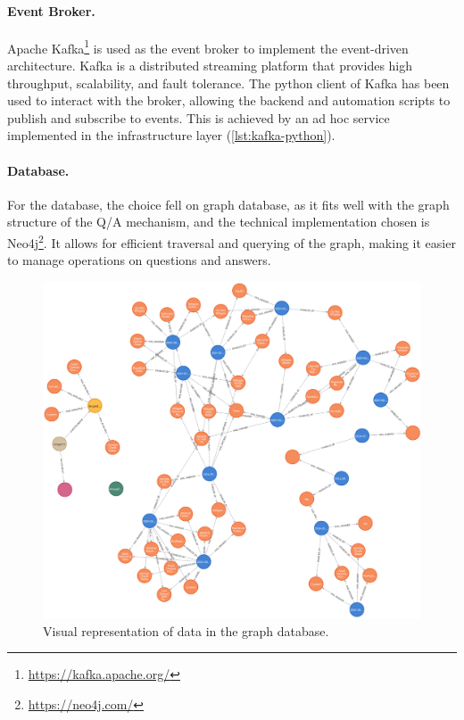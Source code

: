 \documentclass[12pt,a4paper,openright,twoside]{book}
\begin{document}
\paragraph{Event Broker.}

Apache Kafka\footnote{\href{https://kafka.apache.org/}{https://kafka.apache.org/}} is used as the event broker to implement the event-driven architecture.
%
Kafka is a distributed streaming platform that provides high throughput, scalability, and fault tolerance.
%
The python client of Kafka has been used to interact with the broker, allowing the backend and automation scripts to publish and subscribe to events.
%
This is achieved by an ad hoc service implemented in the infrastructure layer (\cref{lst:kafka-python}).





\paragraph{Database.}

For the database, the choice fell on graph database, as it fits well with the graph structure of the \ac{Q/A} mechanism, and the technical implementation chosen is Neo4j\footnote{\href{https://neo4j.com/}{https://neo4j.com/}}.
%
It allows for efficient traversal and querying of the graph, making it easier to manage operations on questions and answers.


\begin{figure}
    \centering
    \includegraphics[width=0.72\linewidth]{figures/graph-db.png}
    \caption{
        Visual representation of data in the graph database.
    }
    \label{fig:graph-db}
\end{figure}
\end{document}
